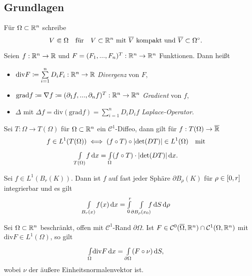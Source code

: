 \documentclass{cheat-sheet}
\newcommand{\grad}{\mathrm{grad}} %
\newcommand{\dive}{\mathrm{div}} %
\begin{document}

\subsection{Grundlagen}

\begin{nota}
  Für $\Omega \subset \mathbb{R}^n$ schreibe
  \[
    V \Subset \Omega
    \quad \text{für} \quad
    \text{$V \subset \mathbb{R}^n$ mit $\overline{V}$ kompakt und $\overline{V} \subset \Omega^{\circ} $.}
  \]
\end{nota}

\begin{nota}
  Seien $f : \mathbb{R}^n \to \mathbb{R}$ und $F = (F_1, ..., F_n)^T : \mathbb{R}^n \to \mathbb{R}^n$ Funktionen. Dann heißt
  \begin{itemize}
    \item $\dive F \coloneqq \sum_{i=1}^n D_i F_i : \R^n \to \R$ \emph{Divergenz} von $F$,
    \item $\grad f \coloneqq \nabla f \coloneqq (\partial_1 f, ..., \partial_n f)^T : \R^n \to \R^n$ \emph{Gradient} von $f$,
    \item $\Delta$ mit $\Delta f = \dive (\grad f) = \sum_{i=1}^n D_i D_i f$ \emph{Laplace-Operator}.
  \end{itemize}
\end{nota}


\begin{satz}[Transformationssatz]
  Sei $T : \Omega \to T(\Omega)$ für $\Omega \subset \mathbb{R}^n$ ein $\mathcal{C}^1$-Diffeo, dann gilt für $f : T(\Omega) \to \overline{\mathbb{R}}$
  \[ f \in L^1(T(\Omega)) \iff (f \circ T) \circ \lvert\det(DT)\rvert \in L^1(\Omega) \quad \text{mit} \]
  \[ {\textstyle \int\limits_{T(\Omega)}^{}} f \,\mathrm{d} x = {\textstyle \int\limits_{\Omega}^{}} (f \circ T) \cdot \lvert\det(DT)\rvert \,\mathrm{d} x. \]
\end{satz}

\begin{bsp}[Polarkoordinaten]
  Sei $f \in L^1(B_r(K))$. Dann ist $f$ auf fast jeder Sphäre $\partial B_\rho(K)$ für $\rho \in \left[ 0, r \right]$ integrierbar und es gilt
  \[ {\textstyle \int\limits_{B_r(x)}^{}} f(x) \,\mathrm{d} x = {\textstyle \int\limits_{0}^{r}} {\textstyle \int\limits_{\partial B_\rho(x_0)}^{}} \!\!\!f \,\mathrm{d} S \,\mathrm{d} \rho \] %
\end{bsp}

\begin{satz}[Gauß]
  Sei $\Omega \subset \mathbb{R}^n$ beschränkt, offen mit $\mathcal{C}^1$-Rand $\partial \Omega$. Ist $F \in \mathcal{C}^0(\overline{\Omega}, \mathbb{R}^n) \cap \mathcal{C}^1(\Omega, \mathbb{R}^n)$ mit $\dive F \in L^1(\Omega)$, so gilt
  \[ \Int{\Omega}{}{\dive F}{x} = \Int{\partial \Omega}{}{(F \circ \nu)}{S}, \]
  wobei $\nu$ der äußere Einheitsnormalenvektor ist.
\end{satz}
\end{document}
